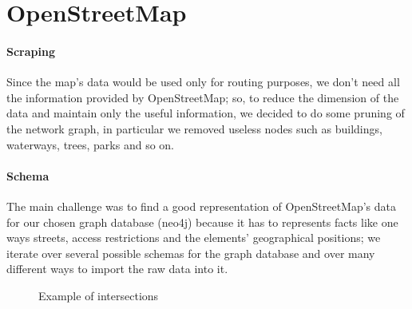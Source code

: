 \section{OpenStreetMap}

\paragraph{Scraping}
Since the map’s data would be used only for routing purposes, we don’t need all 
the information provided by OpenStreetMap; so, to reduce the dimension of the 
data and maintain only the useful information, we decided to do some pruning of 
the network graph, in particular we removed useless nodes such as buildings, 
waterways, trees, parks and so on.

\paragraph{Schema}
The main challenge was to find a good representation of OpenStreetMap’s data 
for our chosen graph database (neo4j) because it has to represents facts like 
one ways streets, access restrictions and the elements’ geographical positions; 
we iterate over several possible schemas for the graph database and over many 
different ways to import the raw data into it.

\begin{figure}[H]
%	
	\caption{Example of intersections}
\end{figure}

